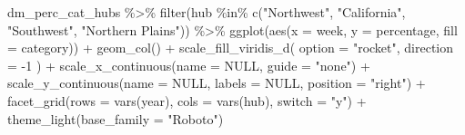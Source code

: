 \documentclass[
]{book}
\newenvironment{Shaded}{\begin{snugshade}}{\end{snugshade}}
\newcommand{\AttributeTok}[1]{\textcolor[rgb]{0.77,0.63,0.00}{#1}}
\newcommand{\ConstantTok}[1]{\textcolor[rgb]{0.00,0.00,0.00}{#1}}
\newcommand{\DecValTok}[1]{\textcolor[rgb]{0.00,0.00,0.81}{#1}}
\newcommand{\FunctionTok}[1]{\textcolor[rgb]{0.00,0.00,0.00}{#1}}
\newcommand{\NormalTok}[1]{#1}
\newcommand{\SpecialCharTok}[1]{\textcolor[rgb]{0.00,0.00,0.00}{#1}}
\newcommand{\StringTok}[1]{\textcolor[rgb]{0.31,0.60,0.02}{#1}}
\begin{document}
\begin{Shaded}
\begin{Highlighting}[]
\NormalTok{dm\_perc\_cat\_hubs }\SpecialCharTok{\%\textgreater{}\%}
  \FunctionTok{filter}\NormalTok{(hub }\SpecialCharTok{\%in\%} \FunctionTok{c}\NormalTok{(}\StringTok{"Northwest"}\NormalTok{, }
                    \StringTok{"California"}\NormalTok{, }
                    \StringTok{"Southwest"}\NormalTok{, }
                    \StringTok{"Northern Plains"}\NormalTok{)) }\SpecialCharTok{\%\textgreater{}\%}
  \FunctionTok{ggplot}\NormalTok{(}\FunctionTok{aes}\NormalTok{(}\AttributeTok{x =}\NormalTok{ week, }
             \AttributeTok{y =}\NormalTok{ percentage,}
             \AttributeTok{fill =}\NormalTok{ category)) }\SpecialCharTok{+}
  \FunctionTok{geom\_col}\NormalTok{() }\SpecialCharTok{+}
  \FunctionTok{scale\_fill\_viridis\_d}\NormalTok{(}
    \AttributeTok{option =} \StringTok{"rocket"}\NormalTok{,}
    \AttributeTok{direction =} \SpecialCharTok{{-}}\DecValTok{1}
\NormalTok{  ) }\SpecialCharTok{+}
  \FunctionTok{scale\_x\_continuous}\NormalTok{(}\AttributeTok{name =} \ConstantTok{NULL}\NormalTok{, }
                     \AttributeTok{guide =} \StringTok{"none"}\NormalTok{) }\SpecialCharTok{+}
  \FunctionTok{scale\_y\_continuous}\NormalTok{(}\AttributeTok{name =} \ConstantTok{NULL}\NormalTok{, }
                     \AttributeTok{labels =} \ConstantTok{NULL}\NormalTok{, }
                     \AttributeTok{position =} \StringTok{"right"}\NormalTok{) }\SpecialCharTok{+}
  \FunctionTok{facet\_grid}\NormalTok{(}\AttributeTok{rows =} \FunctionTok{vars}\NormalTok{(year), }
             \AttributeTok{cols =} \FunctionTok{vars}\NormalTok{(hub), }
             \AttributeTok{switch =} \StringTok{"y"}\NormalTok{) }\SpecialCharTok{+}
  \FunctionTok{theme\_light}\NormalTok{(}\AttributeTok{base\_family =} \StringTok{"Roboto"}\NormalTok{)}
\end{Highlighting}
\end{Shaded}
\end{document}
